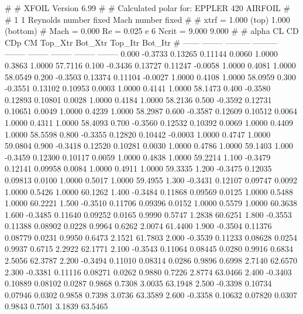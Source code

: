 #  
#       XFOIL         Version 6.99
#  
# Calculated polar for: EPPLER 420 AIRFOIL                              
#  
# 1 1 Reynolds number fixed          Mach number fixed         
#  
# xtrf =   1.000 (top)        1.000 (bottom)  
# Mach =   0.000     Re =     0.025 e 6     Ncrit =   9.000  9.000
#  
#   alpha    CL        CD       CDp       CM     Top_Xtr  Bot_Xtr  Top_Itr  Bot_Itr
#  ------ -------- --------- --------- -------- -------- -------- -------- --------
   0.000  -0.3733   0.13265   0.11144   0.0060   1.0000   0.3863   1.0000  57.7116
   0.100  -0.3436   0.13727   0.11247  -0.0058   1.0000   0.4081   1.0000  58.0549
   0.200  -0.3503   0.13374   0.11104  -0.0027   1.0000   0.4108   1.0000  58.0959
   0.300  -0.3551   0.13102   0.10953   0.0003   1.0000   0.4141   1.0000  58.1473
   0.400  -0.3580   0.12893   0.10801   0.0028   1.0000   0.4184   1.0000  58.2136
   0.500  -0.3592   0.12731   0.10651   0.0049   1.0000   0.4239   1.0000  58.2987
   0.600  -0.3587   0.12609   0.10512   0.0064   1.0000   0.4311   1.0000  58.4093
   0.700  -0.3560   0.12532   0.10392   0.0069   1.0000   0.4409   1.0000  58.5598
   0.800  -0.3355   0.12820   0.10442  -0.0003   1.0000   0.4747   1.0000  59.0804
   0.900  -0.3418   0.12520   0.10281   0.0030   1.0000   0.4786   1.0000  59.1403
   1.000  -0.3459   0.12300   0.10117   0.0059   1.0000   0.4838   1.0000  59.2214
   1.100  -0.3479   0.12141   0.09958   0.0084   1.0000   0.4911   1.0000  59.3335
   1.200  -0.3475   0.12035   0.09813   0.0100   1.0000   0.5017   1.0000  59.4955
   1.300  -0.3431   0.12107   0.09747   0.0092   1.0000   0.5426   1.0000  60.1262
   1.400  -0.3484   0.11868   0.09569   0.0125   1.0000   0.5488   1.0000  60.2221
   1.500  -0.3510   0.11706   0.09396   0.0152   1.0000   0.5579   1.0000  60.3638
   1.600  -0.3485   0.11640   0.09252   0.0165   0.9990   0.5747   1.2838  60.6251
   1.800  -0.3553   0.11388   0.08902   0.0228   0.9964   0.6262   2.0074  61.4400
   1.900  -0.3504   0.11376   0.08779   0.0231   0.9950   0.6473   2.1521  61.7803
   2.000  -0.3539   0.11233   0.08628   0.0254   0.9937   0.6715   2.2922  62.1771
   2.100  -0.3543   0.11064   0.08445   0.0280   0.9916   0.6834   2.5056  62.3787
   2.200  -0.3494   0.11010   0.08314   0.0286   0.9896   0.6998   2.7140  62.6570
   2.300  -0.3381   0.11116   0.08271   0.0262   0.9880   0.7226   2.8774  63.0466
   2.400  -0.3403   0.10889   0.08102   0.0287   0.9868   0.7308   3.0035  63.1948
   2.500  -0.3398   0.10734   0.07946   0.0302   0.9858   0.7398   3.0736  63.3589
   2.600  -0.3358   0.10632   0.07820   0.0307   0.9843   0.7501   3.1839  63.5465
